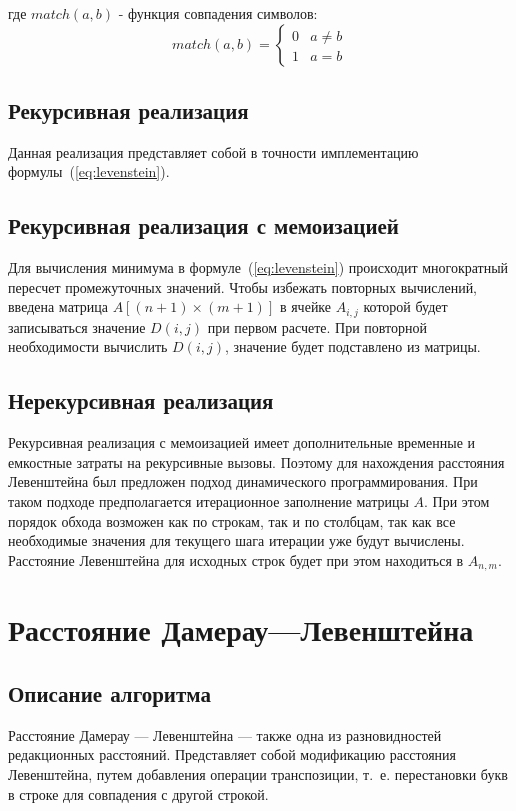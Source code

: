 где $match(a, b)$ - функция совпадения символов:
\begin{equation}
	\label{eq:levenstein_match}
	match(a, b) = 
	\begin{cases}
		0 &a \neq b\\
		1 &a = b
	\end{cases}
\end{equation}
\subsection{Рекурсивная реализация}

Данная реализация представляет собой в точности имплементацию формулы~(\ref{eq:levenstein}).

\subsection{Рекурсивная реализация с мемоизацией}

Для вычисления минимума в формуле~(\ref{eq:levenstein}) происходит многократный пересчет промежуточных значений. Чтобы избежать повторных вычислений, введена матрица $A[(n + 1) \times (m + 1)]$ в ячейке $A_{i, j}$ которой будет записываться значение $D(i, j)$ при первом расчете. При повторной необходимости вычислить $D(i, j)$, значение будет подставлено из матрицы.
\subsection{Нерекурсивная реализация}

Рекурсивная реализация с мемоизацией имеет дополнительные временные и емкостные затраты на рекурсивные вызовы. Поэтому для нахождения расстояния Левенштейна был предложен подход динамического программирования. При таком подходе предполагается итерационное заполнение матрицы $A$. При этом порядок обхода возможен как по строкам, так и по столбцам, так как все необходимые значения для текущего шага итерации уже будут вычислены. Расстояние Левенштейна для исходных строк будет при этом находиться в $A_{n, m}$.

\section{Расстояние Дамерау---Левенштейна}
\subsection{Описание алгоритма}

Расстояние Дамерау --- Левенштейна --- также одна из разновидностей редакционных расстояний. Представляет собой модификацию расстояния Левенштейна, путем добавления операции транспозиции, т.~е. перестановки букв в строке для совпадения с другой строкой.

